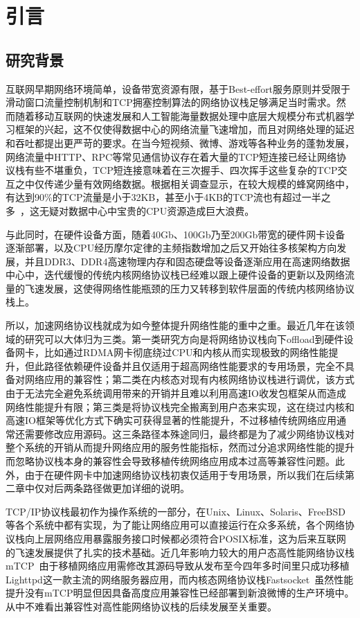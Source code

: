 \chapter{引言}
\label{cha:intro}

\section{研究背景}
\label{sec:01_general_intro}

互联网早期网络环境简单，设备带宽资源有限，基于Best-effort服务原则并受限于滑动窗口流量控制机制和TCP拥塞控制算法的网络协议栈足够满足当时需求。然而随着移动互联网的快速发展和人工智能海量数据处理中底层大规模分布式机器学习框架的兴起，这不仅使得数据中心的网络流量飞速增加，而且对网络处理的延迟和吞吐都提出更严苛的要求。在当今短视频、微博、游戏等各种业务的蓬勃发展，网络流量中HTTP、RPC等常见通信协议存在着大量的TCP短连接已经让网络协议栈有些不堪重负，TCP短连接意味着在三次握手、四次挥手这些复杂的TCP交互之中仅传递少量有效网络数据。根据相关调查显示，在较大规模的蜂窝网络中，有达到90\%的TCP流量是小于32KB，甚至小于4KB的TCP流也有超过一半之多~\cite{woo2013comparison}，这无疑对数据中心中宝贵的CPU资源造成巨大浪费。

与此同时，在硬件设备方面，随着40Gb、100Gb乃至200Gb带宽的硬件网卡设备逐渐部署，以及CPU经历摩尔定律的主频指数增加之后又开始往多核架构方向发展，并且DDR3、DDR4高速物理内存和固态硬盘等设备逐渐应用在高速网络数据中心中，迭代缓慢的传统内核网络协议栈已经难以跟上硬件设备的更新以及网络流量的飞速发展，这使得网络性能瓶颈的压力又转移到软件层面的传统内核网络协议栈上。

所以，加速网络协议栈就成为如今整体提升网络性能的重中之重。最近几年在该领域的研究可以大体归为三类。第一类研究方向是将网络协议栈向下offload到硬件设备网卡，比如通过RDMA网卡彻底绕过CPU和内核从而实现极致的网络性能提升，但此路径依赖硬件设备并且仅适用于超高网络性能要求的专用场景，完全不具备对网络应用的兼容性；第二类在内核态对现有内核网络协议栈进行调优，该方式由于无法完全避免系统调用带来的开销并且难以利用高速IO收发包框架从而造成网络性能提升有限；第三类是将协议栈完全搬离到用户态来实现，这在绕过内核和高速IO框架等优化方式下确实可获得显著的性能提升，不过移植传统网络应用通常还需要修改应用源码。这三条路径本殊途同归，最终都是为了减少网络协议栈对整个系统的开销从而提升网络应用的服务性能指标，然而过分追求网络性能的提升而忽略协议栈本身的兼容性会导致移植传统网络应用成本过高等兼容性问题。此外，由于在硬件网卡中加速网络协议栈初衷仅适用于专用场景，所以我们在后续第二章中仅对后两条路径做更加详细的说明。

TCP/IP协议栈最初作为操作系统的一部分，在Unix、Linux、Solaris、FreeBSD等各个系统中都有实现，为了能让网络应用可以直接运行在众多系统，各个网络协议栈向上层网络应用暴露服务接口时候都必须符合POSIX标准，这为后来互联网的飞速发展提供了扎实的技术基础。近几年影响力较大的用户态高性能网络协议栈mTCP~\cite{mTCP}由于移植网络应用需修改其源码导致从发布至今四年多时间里只成功移植Lighttpd这一款主流的网络服务器应用，而内核态网络协议栈Fastsocket~\cite{fastsocket}虽然性能提升没有mTCP明显但因具备高度应用兼容性已经部署到新浪微博的生产环境中。从中不难看出兼容性对高性能网络协议栈的后续发展至关重要。

